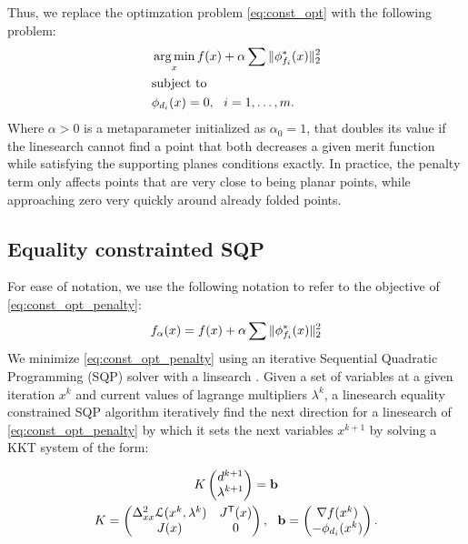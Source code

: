Thus, we replace the optimzation problem \eqref{eq:const_opt} with the following problem:
\begin{equation} \label{eq:const_opt_penalty}
\begin{aligned}
& \operatorname*{arg\,min}_x f(x) + \alpha \sum \|\phi^*_{f_i}(x)\|_2^2 \\
& \textrm{subject to} \\
& \phi_{d_i}(x) = 0, \ \  i = 1, \ldots, m. \\ 
\end{aligned}
\end{equation}
Where $\alpha > 0$ is a metaparameter initialized as $\alpha_0 = 1$, that doubles its value if the linesearch cannot find a point that both decreases a given merit function while satisfying the supporting planes conditions exactly. In practice, the penalty term only affects points that are very close to being planar points, while approaching zero very quickly around already folded points.

\subsection{Equality constrainted SQP}
For ease of notation, we use the following notation to refer to the objective of \eqref{eq:const_opt_penalty}:
\begin{equation}
f_\alpha(x) = f(x) + \alpha \sum \|\phi^*_{f_i}(x)\|_2^2
\end{equation}
We minimize \eqref{eq:const_opt_penalty} using an iterative Sequential Quadratic Programming (SQP) solver with a linsearch \cite{nocedal}. Given a set of variables at a given iteration $x^k$ and current values of lagrange multipliers $\lambda^k$, a linesearch equality constrained SQP algorithm iteratively find the next direction for a linesearch of \eqref{eq:const_opt_penalty} by which it sets the next variables $x^{k+1}$ by solving a KKT system of the form:

\begin{equation} \label{eq:KKT_eps}
\begin{gathered}
{K} \begin{pmatrix} d^{k+1} \\ \lambda^{k+1} \end{pmatrix}=\mathbf{b} \\
{K}=\begin{pmatrix}
{\Delta^2_{xx}\mathcal{L}(x^k,\lambda^k)} & {J^\tr}(x)\\
{J(x)} &  0 \\
\end{pmatrix}, \ \ 
\mathbf{b}=\begin{pmatrix}
{\nabla f(x^k)} \\ 
-\phi_{d_i}(x^k)\\
\end{pmatrix}.
\end{gathered}
\end{equation}

